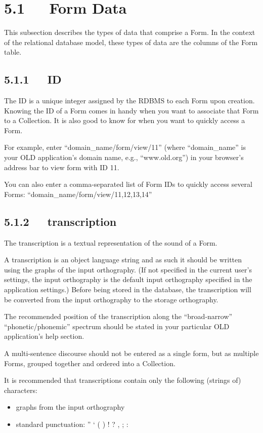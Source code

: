 \documentclass[letterpaper,10pt,english]{sphinxmanual}
\begin{document}
\section{5.1   Form Data}
\label{user_guide:form-data}
This subsection describes the types of data that comprise a Form.  In the
context of the relational database model, these types of data are the columns of
the Form table.


\subsection{5.1.1   ID}
\label{user_guide:id}
The ID is a unique integer assigned by the RDBMS to each Form upon creation.
Knowing the ID of a Form comes in handy when you want to associate that Form to
a Collection.  It is also good to know for when you want to quickly access a
Form.

For example, enter ``domain\_name/form/view/11'' (where
``domain\_name'' is your OLD application's domain name, e.g., ``www.old.org'') in
your browser's address bar to view form with ID 11.

You can also enter a comma-separated list of Form IDs to quickly access several
Forms: ``domain\_name/form/view/11,12,13,14''


\subsection{5.1.2   transcription}
\label{user_guide:transcription}
The transcription is a textual representation of the sound of a Form.

A transcription is an object language string and as such it should be written
using the graphs of the input orthography.  (If not specified in the current
user's settings, the input orthography is the default input orthography
specified in the application settings.)  Before being stored in the database,
the transcription will be converted from the input orthography to the
storage orthography.

The recommended position of the transcription along the ``broad-narrow''
``phonetic/phonemic'' spectrum should be stated in your particular OLD
application's help section.

A multi-sentence discourse should not be entered as a single form, but as
multiple Forms, grouped together and ordered into a Collection.

It is recommended that transcriptions contain only the following (strings of)
characters:
\begin{itemize}
\item {} 
graphs from the input orthography

\item {} 
standard punctuation: '' ` ( ) ! ? , ; :

\end{itemize}
\end{document}
